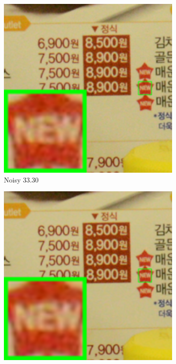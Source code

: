 \begin{figure}
    \centering
    \begin{subfigure}[t]{0.19\textwidth}
        \centering
        \includegraphics[width=1\textwidth]{images/guided/resize_br_Noisy_CC_Noisy_Nikon_D800_ISO_3200_A3_66.png}
	   \caption{Noisy 33.30}
    \end{subfigure}
    \hfill
    \begin{subfigure}[t]{0.19\textwidth}
        \centering
        \includegraphics[width=1\textwidth]{images/guided/resize_br_CBM3D_CC_Noisy_Nikon_D800_ISO_3200_A3_66.png}

\end{subfigure}
\end{figure}
